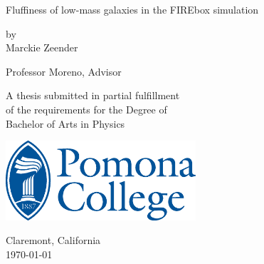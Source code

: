 \documentclass[12pt, oneside]{book}
\begin{document}
\begin{titlepage}
\begin{center}

\vspace*{2cm}

{\huge Fluffiness of low-mass galaxies in the FIREbox simulation} %

\vspace{2cm}

{\large by\\Marckie Zeender}

\vspace{2cm}
{Professor Moreno, Advisor}

\vfill

A thesis submitted in partial fulfillment\\
of the requirements for the Degree of \\
Bachelor of Arts in Physics

\vspace*{1.5cm}

\includegraphics[width=200pt]{pomona.eps}

\vspace*{0.5cm}
Claremont, California\\
\today %
\end{center}
\end{titlepage}

\frontmatter 


\end{document}
